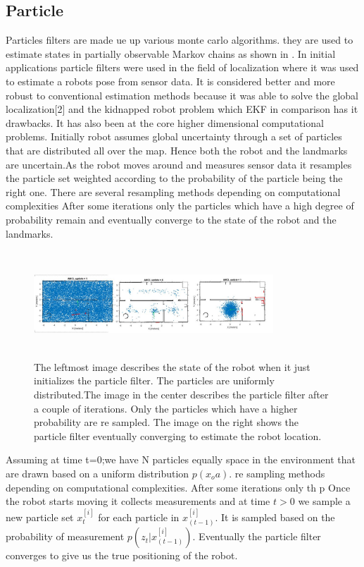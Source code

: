 \documentclass[conference]{IEEEtran}
\begin{document}
\subsection{Particle}      %
Particles filters are made ue up various monte carlo algorithms. they are used to estimate states in partially observable Markov chains as shown in \cite{Doucet2001}. In  initial applications particle filters were used in the field of localization where it was used to estimate a robots pose from sensor data. It is considered better and more robust to conventional estimation methods because it was able to solve the global localization[2] and the kidnapped robot problem\cite{Engelson1992} which EKF in comparison has it drawbacks. It has also been at the core higher dimensional computational problems.  
Initially robot assumes global uncertainty through a set of particles that are distributed all over the map. Hence both the robot and the landmarks are uncertain.As the robot moves around and measures sensor data it resamples the particle set weighted according to the probability of the particle being the right one. There are several resampling methods depending on computational complexities \cite{Li2015} After some iterations only the particles which have a high degree of probability  remain and eventually converge to the state of the robot and the landmarks.
\begin{figure}[h!]
	\centering
	\includegraphics[height=40mm,width=90mm]{Particle_filter_method.JPG}
	\caption{The leftmost image describes the state of the robot when it just initializes the particle filter. The particles are uniformly distributed.The image in the center describes the particle filter after a couple of iterations. Only the particles which have a higher probability are re sampled. The image on the right shows the particle filter eventually converging to estimate the robot location. }
	
\end{figure}
Assuming at time t=0;we have N particles equally space in the environment that are drawn based on a uniform distribution $ p(x_oa)$.                                                                        re sampling methods depending on computational complexities. After some iterations only th   p
Once the robot starts moving it collects measurements and at time $t>0$ we sample a new particle set $x^{[i]}_t$ for each particle in $x^{[i]}_{(t-1)}$. It is sampled based on the probability of measurement $p(z_t|x^{[i]}_{(t-1)})$. Eventually the particle filter converges to give us the true positioning of the robot.
\end{document}

